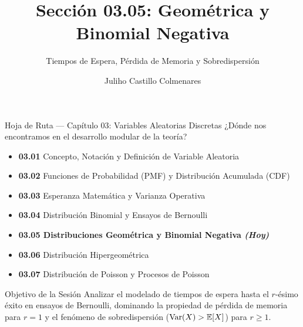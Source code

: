 \documentclass[10pt, aspectratio=169]{beamer}
\title[Geométrica y Binomial Negativa]{Sección 03.05: Geométrica y Binomial Negativa}
\subtitle{Tiempos de Espera, Pérdida de Memoria y Sobredispersión}
\author[J. Castillo Colmenares]{Juliho Castillo Colmenares}
\institute{Tecnológico de Monterrey}
\date{\vspace{-2.0cm}}
\begin{document}
\begin{frame}[plain]
  \vspace{-0.5cm}
  \titlepage
\end{frame}

\begin{frame}{Hoja de Ruta — Capítulo 03: Variables Aleatorias Discretas}
  \footnotesize
  ¿Dónde nos encontramos en el desarrollo modular de la teoría? \pause
  \begin{itemize}\itemsep=0.08em
    \item \textbf{03.01} Concepto, Notación y Definición de Variable Aleatoria \pause
    \item \textbf{03.02} Funciones de Probabilidad (PMF) y Distribución Acumulada (CDF) \pause
    \item \textbf{03.03} Esperanza Matemática y Varianza Operativa \pause
    \item \textbf{03.04} Distribución Binomial y Ensayos de Bernoulli \pause
    \item \color{TecRojo}\textbf{03.05 Distribuciones Geométrica y Binomial Negativa \emph{(Hoy)}}\color{black} \pause
    \item \textbf{03.06} Distribución Hipergeométrica \pause
    \item \textbf{03.07} Distribución de Poisson y Procesos de Poisson
  \end{itemize}
  \vspace{-0.1cm}
  \begin{block}{Objetivo de la Sesión}
    Analizar el modelado de tiempos de espera hasta el $r$-ésimo éxito en ensayos de Bernoulli, dominando la propiedad de pérdida de memoria para $r=1$ y el fenómeno de sobredispersión ($\operatorname{Var}(X) > \mathbb{E}[X]$) para $r \ge 1$.
  \end{block}
\end{frame}
\end{document}
